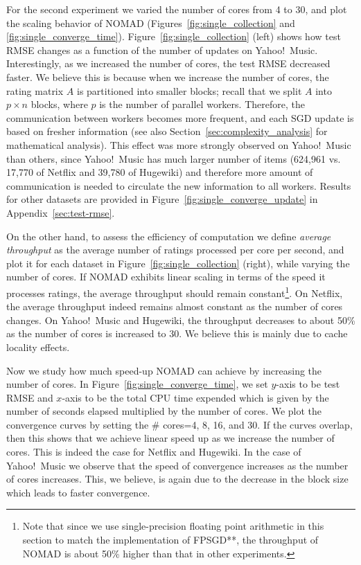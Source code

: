 \documentclass{vldb}
\begin{document}
For the second experiment we varied the number of cores from 4 to 30,
and plot the scaling behavior of NOMAD
(Figures~\ref{fig:single_collection} and
\ref{fig:single_converge_time}).  Figure~\ref{fig:single_collection}
(left) shows how test RMSE changes as a function of the number of
updates on Yahoo!~Music.  Interestingly, as we increased the number of
cores, the test RMSE decreased faster.  We believe this is because when
we increase the number of cores, the rating matrix $A$ is partitioned
into smaller blocks; recall that we split $A$ into $p \times n$ blocks,
where $p$ is the number of parallel workers.  Therefore, the
communication between workers becomes more frequent, and each SGD update
is based on fresher information (see also
Section~\ref{sec:complexity_analysis} for mathematical analysis).  This
effect was more strongly observed on Yahoo!~Music than others, since
Yahoo!~Music has much larger number of items (624,961 vs. 17,770 of
Netflix and 39,780 of Hugewiki) and therefore more amount of
communication is needed to circulate the new information to all workers.
Results for other datasets are provided in
Figure~\ref{fig:single_converge_update} in Appendix~\ref{sec:test-rmse}.

On the other hand, to assess the efficiency of computation we define
\emph{average throughput} as the average number of ratings processed
per core per second, and plot it for each dataset in
Figure~\ref{fig:single_collection} (right), while varying the number
of cores.  If NOMAD exhibits linear scaling in terms of the speed it
processes ratings, the average throughput should remain
constant\footnote{Note that since we use single-precision floating
  point arithmetic in this section to match the implementation of
  FPSGD**, the throughput of NOMAD is about 50\% higher than that in
  other experiments.}.  On Netflix, the average throughput
indeed remains almost constant as the number of cores changes.  On
Yahoo!~Music and Hugewiki, the throughput decreases to about
50\% as the number of cores is increased to 30.  We believe this is
mainly due to cache locality effects. 

Now we study how much speed-up NOMAD can achieve by increasing the
number of cores.  In Figure~\ref{fig:single_converge_time}, we set
$y$-axis to be test RMSE and $x$-axis to be the total CPU time expended
which is given by the number of seconds elapsed multiplied by the number
of cores.  We plot the convergence curves by setting the \# cores=4, 8,
16, and 30. If the curves overlap, then this shows that we achieve
linear speed up as we increase the number of cores. This is indeed the
case for Netflix and Hugewiki. In the case of Yahoo!~Music we observe
that the speed of convergence increases as the number of cores
increases. This, we believe, is again due to the decrease in the block
size which leads to faster convergence.
\end{document}
